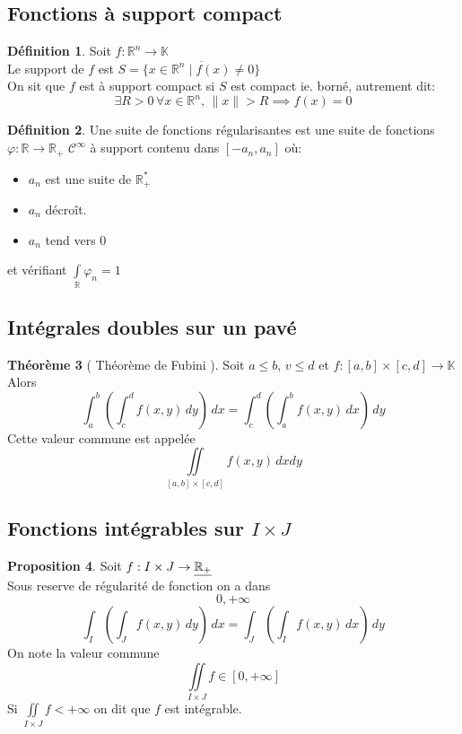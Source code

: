 \documentclass[10pt,a4paper]{article}
\theoremstyle{definition}
\newtheorem{proposition}{Proposition}[section]
\newtheorem{theorem}[proposition]{Théorème}
\newtheorem{definition}[proposition]{Définition}
\begin{document}
\subsection{Fonctions à support compact}
\begin{definition}
    Soit \(f: \mathbb{R}^n \to \mathbb{K}\) \\
    Le support de \(f\) est \(S = \overline{\{ x \in \mathbb{R}^n \mid f(x) \neq 0\}}\) \\
    On sit que \(f\) est à support compact si \(S\) est compact ie. borné, autrement dit:
    \[\exists R > 0 \, \forall x \in \mathbb{R}^n,\, \lVert x\rVert > R \implies f(x) = 0\]
\end{definition}
\begin{definition}
    Une suite de fonctions régularisantes est une suite de fonctions \\
    \(\varphi: \mathbb{R} \to \mathbb{R}_+\) \(\mathcal{C}^{\infty}\) à support contenu dans \([-a_n, a_n]\) où:
    \begin{itemize}
        \item \(a_n\) est une suite de \(\mathbb{R}_+^*\)
        \item \(a_n\) décroît.
        \item \(a_n\) tend vers \(0\)
    \end{itemize}
    et vérifiant \(\int\limits_{\mathbb{R}} \varphi_n = 1\)
\end{definition}

\subsection{Intégrales doubles sur un pavé}
\begin{theorem}[ Théorème de Fubini ]
    Soit \(a \leq b,\, v \leq d\) et \(f:[a, b] \times [c, d] \to \mathbb{K}\) \\
    Alors
    \[\int_{a}^{b} \left(\int_{c}^{d} f(x, y) \,dy\right) \,dx = \int_{c}^{d} \left(\int_{a}^{b} f(x, y) \,dx\right) \,dy\]
    Cette valeur commune est appelée
    \[\iint\limits_{[a, b] \times [c, d]}f(x, y) \, dx dy\]
\end{theorem}

\subsection{Fonctions intégrables sur \(I \times J\)}
\begin{proposition}
    Soit \(f: I \times J \to \uline{\mathbb{R}_+}\) \\
    Sous reserve de régularité de fonction on a dans \[0, +\infty\]
    \[\int_{I} \left(\int_{J} f(x, y) \,dy\right) \,dx = \int_{J} \left(\int_{I} f(x, y) \,dx\right) \,dy\]
    On note la valeur commune
    \[\iint\limits_{I \times J} f \in [0, +\infty]\]
    Si \(\iint\limits_{I \times J} f < +\infty\) on dit que \(f\) est intégrable.
\end{proposition}
\end{document}
